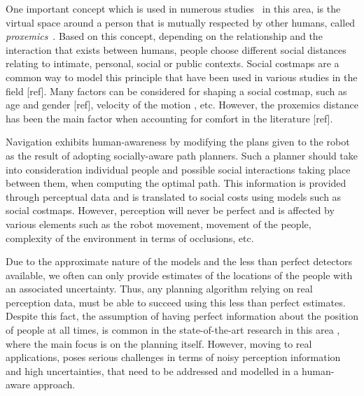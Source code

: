 One important concept which is used in numerous studies~\cite{Mumm2011,Takayama2009,Walters2011,ferrer2013robot} in this area, is the virtual space around a person that is mutually respected by other humans, called \textit{proxemics}~\cite{Hall1969}.
Based on this concept, depending on the relationship and the interaction that exists between humans, people choose different social distances relating to intimate, personal, social or public contexts.
Social costmaps are a common way to model this principle that have been used in various studies in the field [ref]. Many factors can be considered for shaping a social costmap, such as age and gender [ref], velocity of the motion \cite{kirby2009companion}, etc. However, the proxemics distance has been the main factor when accounting for comfort in the literature [ref].%

Navigation exhibits human-awareness by modifying the plans given to the robot as the result of adopting socially-aware path planners.
Such a planner should take into consideration individual people and possible social interactions taking place between them, when computing the optimal path. This information is provided through perceptual data and is translated to social costs using models such as social costmaps. However, perception will never be perfect and is affected by various elements such as the robot movement, movement of the people, complexity of the environment in terms of occlusions, etc. 


Due to the approximate nature of the models and the less than perfect detectors available, we often can only provide estimates of the locations of the people with an associated uncertainty. Thus, any planning algorithm relying on real perception data, must be able to succeed using this less than perfect estimates. Despite this fact, the assumption of having perfect information about the position of people at all times, is common in the state-of-the-art research in this area , where the main focus is on the planning itself. However, moving to real applications, poses serious challenges in terms of noisy perception information and high uncertainties, that need to be addressed and modelled in a human-aware approach.


